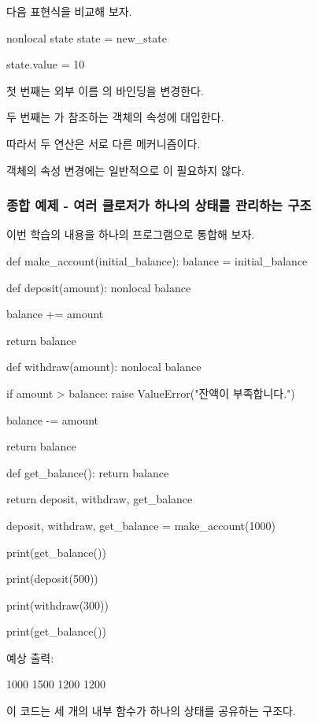다음 표현식을 비교해 보자.

\begin{dhkcode}
nonlocal state
state = new_state


state.value = 10
\end{dhkcode}

첫 번째는 외부 이름 의 바인딩을 변경한다.

두 번째는 가 참조하는 객체의 속성에 대입한다.

따라서 두 연산은 서로 다른 메커니즘이다.

객체의 속성 변경에는 일반적으로 이 필요하지 않다.

\subsubsection{종합 예제 - 여러 클로저가 하나의 상태를 관리하는 구조}

이번 학습의 내용을 하나의 프로그램으로 통합해 보자.

\begin{dhkcode}
def make_account(initial_balance):
    balance = initial_balance

    def deposit(amount):
        nonlocal balance

        balance += amount

        return balance

    def withdraw(amount):
        nonlocal balance

        if amount > balance:
            raise ValueError("잔액이 부족합니다.")

        balance -= amount

        return balance

    def get_balance():
        return balance

    return deposit, withdraw, get_balance


deposit, withdraw, get_balance = make_account(1000)

print(get_balance())

print(deposit(500))

print(withdraw(300))

print(get_balance())
\end{dhkcode}

예상 출력:

\begin{dhkzsh}
1000
1500
1200
1200
\end{dhkzsh}

이 코드는 세 개의 내부 함수가 하나의 상태를 공유하는 구조다.


